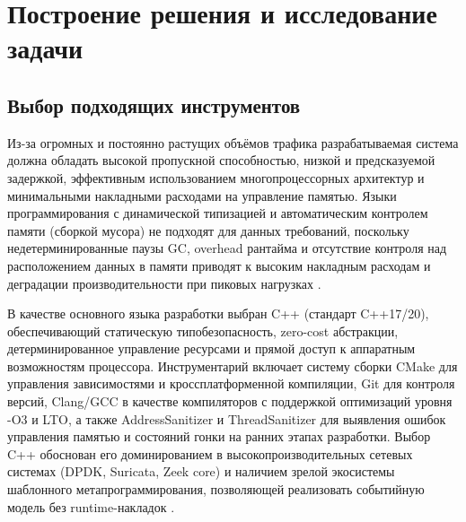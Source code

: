 \section{Построение решения и исследование задачи}
\subsection{Выбор подходящих инструментов}

Из-за огромных и постоянно растущих объёмов трафика разрабатываемая система должна обладать высокой пропускной способностью, низкой и предсказуемой задержкой, эффективным использованием многопроцессорных архитектур и минимальными накладными расходами на управление памятью.
Языки программирования с динамической типизацией и автоматическим контролем памяти (сборкой мусора) не подходят для данных требований, поскольку недетерминированные паузы GC, overhead рантайма и отсутствие контроля над расположением данных в памяти приводят к высоким накладным расходам и деградации производительности при пиковых нагрузках \cite{realtime2021gc}.


В качестве основного языка разработки выбран C++ (стандарт C++17/20), обеспечивающий статическую типобезопасность, zero-cost абстракции, детерминированное управление ресурсами и прямой доступ к аппаратным возможностям процессора.
Инструментарий включает систему сборки CMake для управления зависимостями и кроссплатформенной компиляции, Git для контроля версий, Clang/GCC в качестве компиляторов с поддержкой оптимизаций уровня -O3 и LTO, а также AddressSanitizer и ThreadSanitizer для выявления ошибок управления памятью и состояний гонки на ранних этапах разработки.
Выбор C++ обоснован его доминированием в высокопроизводительных сетевых системах (DPDK, Suricata, Zeek core) и наличием зрелой экосистемы шаблонного метапрограммирования, позволяющей реализовать событийную модель без runtime-накладок \cite{cpp2023perf}.

